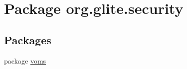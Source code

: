 \hypertarget{namespaceorg_1_1glite_1_1security}{
\section{Package org.glite.security}
\label{namespaceorg_1_1glite_1_1security}
}
\subsection*{Packages}
\begin{DoxyCompactItemize}
\item 
package \hyperlink{namespaceorg_1_1glite_1_1security_1_1voms}{voms}
\end{DoxyCompactItemize}
